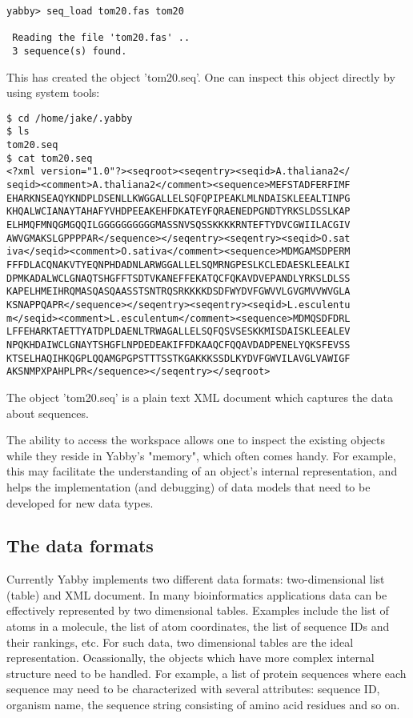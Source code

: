 \begin{verbatim}
yabby> seq_load tom20.fas tom20

 Reading the file 'tom20.fas' ..
 3 sequence(s) found.
\end{verbatim}

This has created the object 'tom20.seq'.  One can inspect this object
directly by using system tools:

\begin{verbatim}
$ cd /home/jake/.yabby
$ ls
tom20.seq
$ cat tom20.seq
<?xml version="1.0"?><seqroot><seqentry><seqid>A.thaliana2</
seqid><comment>A.thaliana2</comment><sequence>MEFSTADFERFIMF
EHARKNSEAQYKNDPLDSENLLKWGGALLELSQFQPIPEAKLMLNDAISKLEEALTINPG
KHQALWCIANAYTAHAFYVHDPEEAKEHFDKATEYFQRAENEDPGNDTYRKSLDSSLKAP
ELHMQFMNQGMGQQILGGGGGGGGGGMASSNVSQSSKKKKRNTEFTYDVCGWIILACGIV
AWVGMAKSLGPPPPAR</sequence></seqentry><seqentry><seqid>O.sat
iva</seqid><comment>O.sativa</comment><sequence>MDMGAMSDPERM
FFFDLACQNAKVTYEQNPHDADNLARWGGALLELSQMRNGPESLKCLEDAESKLEEALKI
DPMKADALWCLGNAQTSHGFFTSDTVKANEFFEKATQCFQKAVDVEPANDLYRKSLDLSS
KAPELHMEIHRQMASQASQAASSTSNTRQSRKKKKDSDFWYDVFGWVVLGVGMVVWVGLA
KSNAPPQAPR</sequence></seqentry><seqentry><seqid>L.esculentu
m</seqid><comment>L.esculentum</comment><sequence>MDMQSDFDRL
LFFEHARKTAETTYATDPLDAENLTRWAGALLELSQFQSVSESKKMISDAISKLEEALEV
NPQKHDAIWCLGNAYTSHGFLNPDEDEAKIFFDKAAQCFQQAVDADPENELYQKSFEVSS
KTSELHAQIHKQGPLQQAMGPGPSTTTSSTKGAKKKSSDLKYDVFGWVILAVGLVAWIGF
AKSNMPXPAHPLPR</sequence></seqentry></seqroot>
\end{verbatim}

The object 'tom20.seq' is a plain text XML document which captures
the data about sequences.

The ability to access the workspace allows one to inspect the
existing objects while they reside in Yabby's "memory", which
often comes handy. For example, this may facilitate the understanding
of an object's internal representation, and helps the implementation
(and debugging) of data models that need to be developed for new
data types. 

\subsection{The data formats}

Currently Yabby implements two different data formats: two-dimensional
list (table) and XML document. In many bioinformatics applications data
can be effectively represented by two dimensional tables. Examples
include the list of atoms in a molecule, the list of atom coordinates,
the list of sequence IDs and their rankings, etc. For such data, two
dimensional tables are the ideal representation. Ocassionally, the objects
which have more complex internal structure need to be handled. For
example, a list of protein sequences where each sequence may need to
be characterized with several attributes: sequence ID, organism name, 
the sequence string consisting of amino acid residues and so on.

